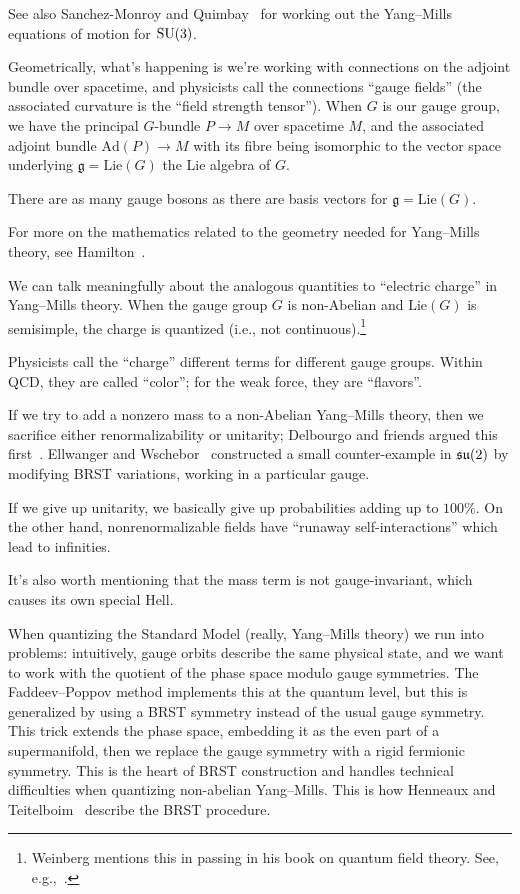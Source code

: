 \begin{remark}
See also Sanchez-Monroy and Quimbay~\cite{Sanchez-Monroy:2006sie} for
working out the Yang--Mills equations of motion for $\operatorname{SU}(3)$.
\end{remark}

\M
Geometrically, what's happening is we're working with connections on the
adjoint bundle over spacetime, and physicists call the connections
``gauge fields'' (the associated curvature is the ``field strength tensor'').
When $G$ is our gauge group, we have the principal $G$-bundle $P\to M$
over spacetime $M$, and the associated adjoint bundle $\mathrm{Ad}(P)\to M$
with its fibre being isomorphic to the vector space underlying
$\mathfrak{g}=\mathrm{Lie}(G)$ the Lie algebra of $G$.

There are as many gauge bosons as there are basis vectors for $\mathfrak{g}=\mathrm{Lie}(G)$.

For more on the mathematics related to the geometry needed for
Yang--Mills theory, see Hamilton~\cite{Hamilton:2017gbn}.

We can talk meaningfully about the analogous quantities to ``electric
charge'' in Yang--Mills theory. When the gauge group $G$ is non-Abelian
and $\mathrm{Lie}(G)$ is semisimple,
the charge is quantized (i.e., not continuous).\footnote{Weinberg
mentions this in passing in his book on quantum field theory. See, e.g.,~\cite[esp.~\S3.3,\S23.3]{Weinberg:1995mt}.}

Physicists call the ``charge'' different terms for different gauge
groups. Within QCD, they are called ``color''; for the weak force, they
are ``flavors''.

If we try to add a nonzero mass to a non-Abelian Yang--Mills theory,
then we sacrifice either renormalizability or unitarity; Delbourgo and
friends argued this first~\cite{Delbourgo:1987np}.
Ellwanger and Wschebor~\cite{Ellwanger:2002sj} constructed a small
counter-example in $\mathfrak{su}(2)$ by modifying BRST variations, working in a
particular gauge.

If we give up unitarity, we basically give up probabilities adding up to
$100\%$. On the other hand, nonrenormalizable fields have ``runaway
self-interactions'' which lead to infinities.

It's also worth mentioning that the mass term is not gauge-invariant,
which causes its own special Hell.

When quantizing the Standard Model (really, Yang--Mills theory) we run
into problems: intuitively, gauge orbits describe the same physical
state, and we want to work with the quotient of the phase space modulo
gauge symmetries. The Faddeev--Poppov method implements this at the
quantum level, but this is generalized by using a BRST symmetry instead
of the usual gauge symmetry. This trick extends the phase space, embedding it as
the even part of a supermanifold, then we replace the gauge symmetry
with a rigid fermionic symmetry. This is the heart of BRST construction
and handles technical difficulties when quantizing non-abelian Yang--Mills.
This is how Henneaux and Teitelboim~\cite[\S8.1]{Henneaux:1992ig}
describe the BRST procedure.

